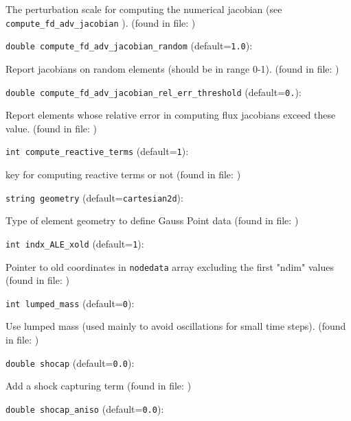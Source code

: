 The perturbation scale for computing the numerical jacobian
 (see \verb+compute_fd_adv_jacobian+ ).
 (found in file: \verb++)
\item\verb+double compute_fd_adv_jacobian_random+ {\rm(default=\verb|1.0|)}:

Report jacobians on random elements (should be in range 0-1).
 (found in file: \verb++)
\item\verb+double compute_fd_adv_jacobian_rel_err_threshold+ {\rm(default=\verb|0.|)}:

Report elements whose relative error in computing
 flux jacobians exceed these value.
 (found in file: \verb++)
\item\verb+int compute_reactive_terms+ {\rm(default=\verb|1|)}:

key for computing reactive terms or not
 (found in file: \verb++)
\item\verb+string geometry+ {\rm(default=\verb|cartesian2d|)}:

Type of element geometry to define Gauss Point data
 (found in file: \verb++)
\item\verb+int indx_ALE_xold+ {\rm(default=\verb|1|)}:

Pointer to old coordinates in
 \verb+nodedata+ array excluding the first "ndim" values
 (found in file: \verb++)
\item\verb+int lumped_mass+ {\rm(default=\verb|0|)}:

Use lumped mass (used mainly to avoid oscillations for small time steps).
 (found in file: \verb++)
\item\verb+double shocap+ {\rm(default=\verb|0.0|)}:

Add a shock capturing term
 (found in file: \verb++)
\item\verb+double shocap_aniso+ {\rm(default=\verb|0.0|)}:


